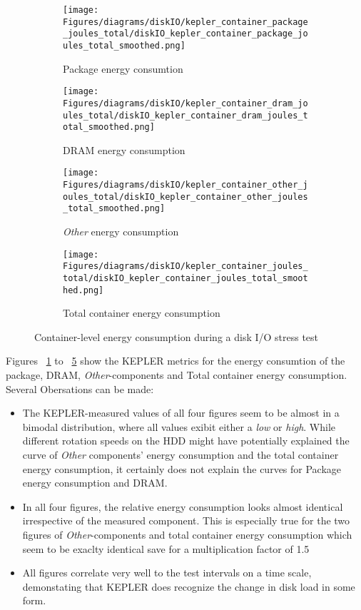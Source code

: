 \begin{figure}[H]
    \centering
    \begin{subfigure}{0.49\textwidth}
        \texttt{[image: Figures/diagrams/diskIO/kepler\_container\_package\_joules\_total/diskIO\_kepler\_container\_package\_joules\_total\_smoothed.png]}
        \caption{Package energy consumtion}
        \label{fig:diskIO_kepler_container_package_joules_total}
    \end{subfigure}
    \begin{subfigure}{0.49\textwidth}
        \texttt{[image: Figures/diagrams/diskIO/kepler\_container\_dram\_joules\_total/diskIO\_kepler\_container\_dram\_joules\_total\_smoothed.png]}
        \caption{DRAM energy consumption}
        \label{fig:diskIO_kepler_container_dram_joules_total}
    \end{subfigure}
    \begin{subfigure}{0.49\textwidth}
        \texttt{[image: Figures/diagrams/diskIO/kepler\_container\_other\_joules\_total/diskIO\_kepler\_container\_other\_joules\_total\_smoothed.png]}
        \caption{\textit{Other} energy consumption}
        \label{fig:diskIO_kepler_container_other_joules_total}
    \end{subfigure}
    \begin{subfigure}{0.49\textwidth}
        \texttt{[image: Figures/diagrams/diskIO/kepler\_container\_joules\_total/diskIO\_kepler\_container\_joules\_total\_smoothed.png]}
        \caption{Total container energy consumption}
        \label{fig:diskIO_kepler_container_joules_total}
    \end{subfigure}
    \caption{Container-level energy consumption during a disk I/O stress test}
\end{figure}

Figures ~\ref{fig:diskIO_kepler_container_package_joules_total} to ~\ref{fig:diskIO_kepler_container_joules_total} show the KEPLER metrics for the energy consumtion of the package, DRAM, \textit{Other}-components and Total container energy consumption. Several Obersations can be made:
\begin{itemize}
    \item The KEPLER-measured values of all four figures seem to be almost in a bimodal distribution, where all values exibit either a \textit{low} or \textit{high}. While different rotation speeds on the HDD might have potentially explained the curve of \textit{Other} components' energy consumption and the total container energy consumption, it certainly does not explain the curves for Package energy consumption and DRAM.
    \item In all four figures, the relative energy consumption looks almost identical irrespective of the measured component. This is especially true for the two figures of \textit{Other}-components and total container energy consumption which seem to be exaclty identical save for a multiplication factor of 1.5
    \item All figures correlate very well to the test intervals on a time scale, demonstating that KEPLER does recognize the change in disk load in some form. 
\end{itemize}

